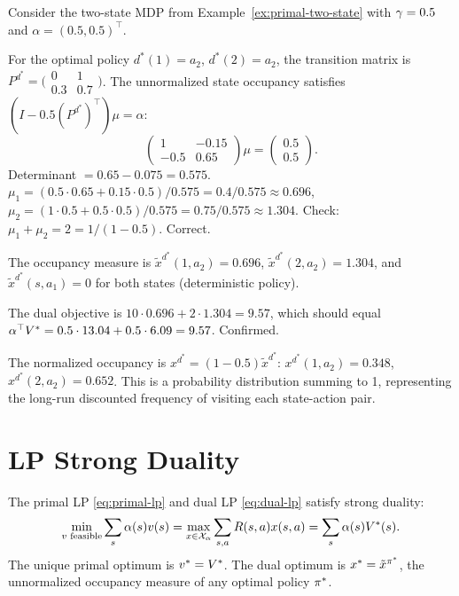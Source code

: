 \documentclass[11pt,a4paper]{article}
\begin{document}
\begin{example}
\label{ex:occupancy-two-state}
Consider the two-state MDP from Example~\ref{ex:primal-two-state}
with $\gamma = 0.5$ and $\alpha = (0.5, 0.5)^\top$.

For the optimal policy $d^*(1) = a_2$, $d^*(2) = a_2$, the
transition matrix is $P^{d^*} = \bigl(\begin{smallmatrix}
0 & 1 \\ 0.3 & 0.7 \end{smallmatrix}\bigr)$. The unnormalized
state occupancy satisfies $(I - 0.5 (P^{d^*})^\top) \mu = \alpha$:
\[
    \begin{pmatrix} 1 & -0.15 \\ -0.5 & 0.65 \end{pmatrix}
    \mu = \begin{pmatrix} 0.5 \\ 0.5 \end{pmatrix}.
\]
Determinant $= 0.65 - 0.075 = 0.575$.
$\mu_1 = (0.5 \cdot 0.65 + 0.15 \cdot 0.5)/0.575
= 0.4/0.575 \approx 0.696$,
$\mu_2 = (1 \cdot 0.5 + 0.5 \cdot 0.5)/0.575
= 0.75/0.575 \approx 1.304$.
Check: $\mu_1 + \mu_2 = 2 = 1/(1-0.5)$. Correct.

The occupancy measure is $\tilde{x}^{d^*}(1, a_2) = 0.696$,
$\tilde{x}^{d^*}(2, a_2) = 1.304$, and
$\tilde{x}^{d^*}(s, a_1) = 0$ for both states (deterministic
policy).

The dual objective is $10 \cdot 0.696 + 2 \cdot 1.304 = 9.57$,
which should equal $\alpha^\top V^* = 0.5 \cdot 13.04 +
0.5 \cdot 6.09 = 9.57$. Confirmed.

The normalized occupancy is $x^{d^*} = (1-0.5) \tilde{x}^{d^*}$:
$x^{d^*}(1, a_2) = 0.348$, $x^{d^*}(2, a_2) = 0.652$. This is a
probability distribution summing to 1, representing the long-run
discounted frequency of visiting each state-action pair.
\end{example}


\section{LP Strong Duality}
\label{sec:strong-duality}

\begin{theorem}
\label{thm:strong-duality}
The primal LP \eqref{eq:primal-lp} and dual LP \eqref{eq:dual-lp}
satisfy strong duality:
\begin{equation}
\label{eq:strong-duality}
    \min_{v \text{ feasible}} \sum_s \alpha(s) v(s)
    = \max_{x \in \mathcal{X}_\alpha} \sum_{s,a} R(s,a) x(s,a)
    = \sum_s \alpha(s) V^*(s).
\end{equation}
The unique primal optimum is $v^* = V^*$. The dual optimum is
$x^* = \tilde{x}^{\pi^*}$, the unnormalized occupancy measure
of any optimal policy $\pi^*$.
\end{theorem}
\end{document}
